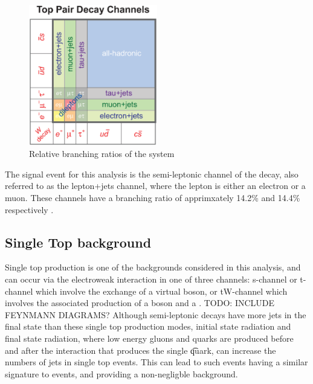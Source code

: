 \begin{figure}[hbtp]
   \centering
     \includegraphics[width=0.5\textwidth]{Chapters/02_Theory/Images/top_pair_decay_channels.eps}\hfill
     \caption{Relative branching ratios of the \ttbar system}
     \label{fig:ttbar_branching_ratios}
\end{figure}

The signal event for this analysis is the semi-leptonic channel of the \ttbar decay, also referred to as
the lepton+jets channel, where the lepton is either an electron or a muon. These channels have a branching
ratio of apprimxately 14.2\% and 14.4\% respectively \cite{Agashe:2014kda}.

\subsection{Single Top background}
\label{ss:single_top}
Single top production is one of the backgrounds considered in this analysis, and can occur via the
electroweak interaction in one of three channels: s-channel or t-channel which involve the exchange of a
virtual \W boson, or tW-channel which involves the associated production of a \W boson and a \tquark. TODO:
INCLUDE FEYNMANN DIAGRAMS? %
Although semi-leptonic \ttbar decays have more jets in the final state than these single top production
modes, initial state radiation and final state radiation, where low energy gluons and quarks are produced
before and after the interaction that produces the single \t quark, can increase the numbers of jets in
single top events. This can lead to such events having a similar signature to \ttbar events, and providing a
non-negligble background.

